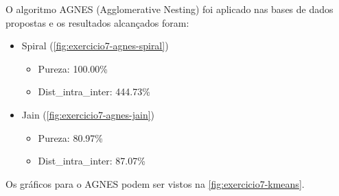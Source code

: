 \documentclass{article}
\begin{document}
O algoritmo AGNES (Agglomerative Nesting) foi aplicado nas bases de dados propostas e os resultados alcançados foram:

\begin{itemize}
	\item Spiral (\autoref{fig:exercicio7-agnes-spiral})
	\begin{itemize}
		\item Pureza: 100.00\%
		\item Dist\_intra\_inter: 444.73\%
	\end{itemize}
	\item Jain (\autoref{fig:exercicio7-agnes-jain})
	\begin{itemize}
		\item Pureza: 80.97\%
		\item Dist\_intra\_inter: 87.07\%
	\end{itemize}
\end{itemize}

Os gráficos para o AGNES podem ser vistos na \autoref{fig:exercicio7-kmeans}.
\end{document}
